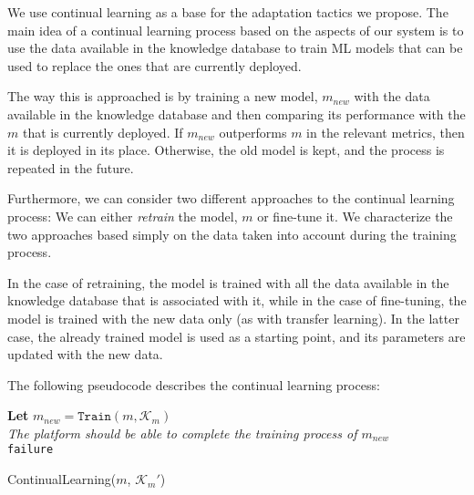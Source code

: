 \documentclass[../main.tex]{subfiles}
\begin{document}
    We use continual learning as a base for the adaptation tactics we propose. The main idea of a continual learning process based on the aspects of our system is to use the data available in the knowledge database to train ML models that can be used to replace the ones that are currently deployed. 
    
    The way this is approached is by training a new model, $m_{new}$ with the data available in the knowledge database and then comparing its performance with the $m$ that is currently deployed. If $m_{new}$ outperforms $m$ in the relevant metrics, then it is deployed in its place. Otherwise, the old model is kept, and the process is repeated in the future.

    Furthermore, we can consider two different approaches to the continual learning process: We can either \textit{retrain} the model, $m$ or fine-tune it. We characterize the two approaches based simply on the data taken into account during the training process. 
    
    In the case of retraining, the model is trained with all the data available in the knowledge database that is associated with it, while in the case of fine-tuning, the model is trained with the new data only (as with transfer learning). In the latter case, the already trained model is used as a starting point, and its parameters are updated with the new data.
    
    
    The following pseudocode describes the continual learning process:

    \vspace{0.25cm}

    \begin{algorithm}[H]
        \SetAlgoLined 
        \textbf{Let} $m_{new} = \texttt{Train}(m, \mathcal{K}_m)$ \\
        \emph{The platform should be able to complete the training process of $m_{new}$} \\
        \Return \texttt{failure}
        \caption{ContinualLearning($m$, $\mathcal{K}_m'$)}
        \label{alg:continual_learning}
    \end{algorithm}
\end{document}
